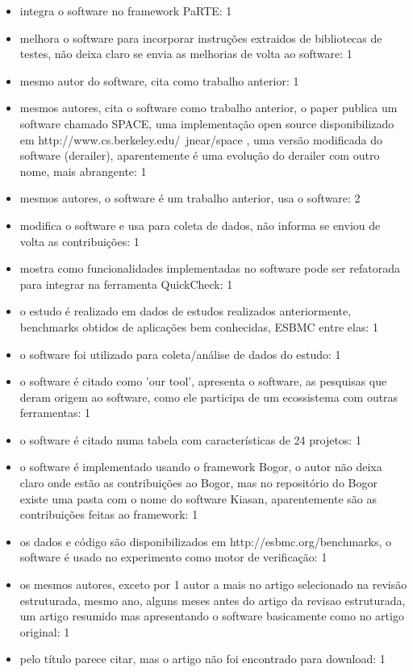 \begin{itemize}
\item integra o software no framework PaRTE: 1
\item melhora o software para incorporar instruções extraidos de bibliotecas de testes, não deixa claro se envia as melhorias de volta ao software: 1
\item mesmo autor do software, cita como trabalho anterior: 1
\item mesmos autores, cita o software como trabalho anterior, o paper publica um software chamado SPACE, uma implementação open source disponibilizado em http://www.cs.berkeley.edu/~jnear/space , uma versão modificada do software (derailer), aparentemente é uma evolução do derailer com outro nome, mais abrangente: 1
\item mesmos autores, o software é um trabalho anterior, usa o software: 2
\item modifica o software e usa para coleta de dados, não informa se enviou de volta as contribuições: 1
\item mostra como funcionalidades implementadas no software pode ser refatorada para integrar na ferramenta QuickCheck: 1
\item o estudo é realizado em dados de estudos realizados anteriormente, benchmarks obtidos de aplicações bem conhecidas, ESBMC entre elas: 1
\item o software foi utilizado para coleta/análise de dados do estudo: 1
\item o software é citado como 'our tool', apresenta o software, as pesquisas que deram origem ao software, como ele participa de um ecossistema com outras ferramentas: 1
\item o software é citado numa tabela com características de 24 projetos: 1
\item o software é implementado usando o framework Bogor, o autor não deixa claro onde estão as contribuições ao Bogor, mas no repositório do Bogor existe uma pasta com o nome do software Kiasan, aparentemente são as contribuições feitas ao framework: 1
\item os dados e código são disponibilizados em http://esbmc.org/benchmarks, o software é usado no experimento como motor de verificação: 1
\item os mesmos autores, exceto por 1 autor a mais no artigo selecionado na revisão estruturada, mesmo ano, alguns meses antes do artigo da revisao estruturada, um artigo resumido mas apresentando o software basicamente como no artigo original: 1
\item pelo título parece citar, mas o artigo não foi encontrado para download: 1

\end{itemize}
